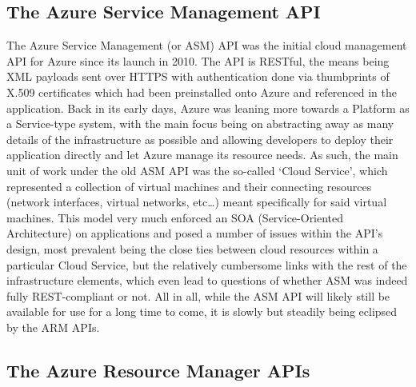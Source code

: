 \documentclass[11pt]{report}
\begin{document}
\subsection{The Azure Service Management API}

The Azure Service Management (or ASM) API was the initial cloud management API
for Azure since its launch in 2010. The API is RESTful, the means being XML
payloads sent over HTTPS with authentication done via thumbprints of X.509
certificates which had been preinstalled onto Azure and referenced in the
application.
Back in its early days, Azure was leaning more towards a Platform as a
Service-type system, with the main focus being on abstracting
away as many details of the infrastructure as possible and allowing developers
to deploy their application directly and let Azure manage its resource needs.
\newline
As such, the main unit of work under the old ASM API was the so-called `Cloud
Service', which represented a collection of virtual machines and their
connecting resources (network interfaces, virtual networks, etc\ldots) meant
specifically for said virtual machines. This model very much enforced an SOA
(Service-Oriented Architecture) on applications and posed a number of issues
within the API's design, most prevalent being the close ties between cloud
resources within a particular Cloud Service, but the relatively cumbersome
links with the rest of the infrastructure elements, which even lead to
questions of whether ASM was indeed fully REST-compliant or not. \newline
All in all, while the ASM API will likely still be available for use for a long
time to come, it is slowly but steadily being eclipsed by the ARM APIs.


\subsection{The Azure Resource Manager APIs}
\end{document}
